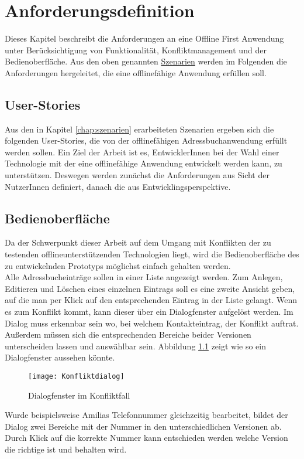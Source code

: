 \chapter{\label{chap:anforderungen}Anforderungsdefinition}
Dieses Kapitel beschreibt die Anforderungen an eine Offline First Anwendung unter Berücksichtigung von Funktionalität, Konfliktmanagement und der Bedienoberfläche.
Aus den oben genannten \hyperref[chap:szenarien]{Szenarien} werden im Folgenden die Anforderungen hergeleitet, die eine offlinefähige Anwendung erfüllen soll.
%
%
\section{User-Stories}
Aus den in Kapitel \ref{chap:szenarien} erarbeiteten Szenarien ergeben sich die folgenden User-Stories, die von der offlinefähigen Adressbuchanwendung erfüllt werden sollen.
Ein Ziel der Arbeit ist es, EntwicklerInnen bei der Wahl einer Technologie mit der eine offlinefähige Anwendung entwickelt werden kann, zu unterstützen.
Deswegen werden zunächst die Anforderungen aus Sicht der NutzerInnen definiert, danach die aus Entwicklingsperspektive.


%
%

%
%
\section{Bedienoberfläche}
Da der Schwerpunkt dieser Arbeit auf dem Umgang mit Konflikten der zu testenden offlineunterstützenden Technologien liegt, wird die Bedienoberfläche des zu entwickelnden Prototyps  möglichst einfach gehalten werden.\\
Alle Adressbucheinträge sollen in einer Liste angezeigt werden. Zum Anlegen, Editieren und Löschen eines einzelnen Eintrags soll es eine zweite Ansicht geben, auf die man per Klick auf den entsprechenden Eintrag in der Liste gelangt.
Wenn es zum Konflikt kommt, kann dieser über ein Dialogfenster aufgelöst werden. Im Dialog muss erkennbar sein wo, bei welchem Kontakteintrag, der Konflikt auftrat. Außerdem müssen sich die entsprechenden Bereiche beider Versionen unterscheiden lassen und auswählbar sein. Abbildung \ref{fig:dialog} zeigt wie so ein Dialogfenster aussehen könnte.
\begin{figure}[H]
    \centering
    \texttt{[image: Konfliktdialog]}
    \grayRule
    \caption{Dialogfenster im Konfliktfall}
    \label{fig:dialog}
\end{figure}
Wurde beispielsweise Amilias Telefonnummer gleichzeitig bearbeitet, bildet der Dialog zwei Bereiche mit der Nummer in den unterschiedlichen Versionen ab.
Durch Klick auf die korrekte Nummer kann entschieden werden welche Version die richtige ist und behalten wird.